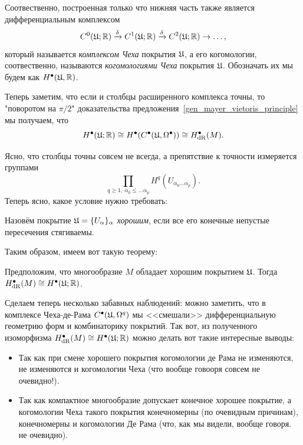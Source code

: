 	 \begin{definition} 
	 	Соотвественно, построенная только что нижняя часть также является дифференциальным комплексом 
	 \[
	 	C^{0}(\mathfrak{U}; \mathbb{R}) \xrightarrow{\delta} C^{1}(\mathfrak{U}; \mathbb{R}) \xrightarrow{\delta} C^{2}(\mathfrak{U}; \mathbb{R})  \to \ldots,
	 \]
	 который называется \emph{комплексом Чеха} покрытия $\mathfrak{U}$, а его когомологии, соотвественно, называются \emph{когомологиями Чеха} покрытия $\mathfrak{U}$. Обозначать их мы будем как $H^{\bullet}(\mathfrak{U}, \mathbb{R})$. 

	 \end{definition}

	 
	 Теперь  заметим, что если и столбцы расширенного комплекса точны, то "поворотом на $\pi/2$" доказательства предложения~\ref{gen_mayer_vietoris_principle} мы получаем, что
	 \[
	  	H^{\bullet}(\mathfrak{U}; \mathbb{R}) \cong H^{\bullet}(C^{\bullet}(\mathfrak{U}, \Omega^{\bullet})) \cong H^{\bullet}_{\operatorname{dR}}(M).
	  \] 

	  Ясно, что столбцы точны совсем не всегда, а препятствие к точности измеряется группами 
	  \[
	  	\prod_{q \ge 1, \ \alpha_0 \le \ldots \alpha_p} H^{q}(U_{\alpha_0 \ldots \alpha_p}).
	  \]
	  Теперь ясно, какое условие нужно требовать: 

	  \begin{definition} 
	  	Назовём покрытие $\mathfrak{U} = \{ U_{\alpha} \}_{\alpha}$ \emph{хорошим}, если все его конечные непустые пересечения стягиваемы. 
	  \end{definition}

	  Таким образом, имеем вот такую теорему: 

	  \begin{theorem} 
	  		Предположим, что многообразие $M$ обладает хорошим покрытием  $\mathfrak{U}$. Тогда $H^{\bullet}_{\operatorname{dR}}(M) \cong H^{\bullet}(\mathfrak{U}; \mathbb{R})$.
	  \end{theorem}

	  Сделаем теперь несколько забавных наблюдений: можно заметить, что в комплексе Чеха-де-Рама $C^{\bullet}(\mathfrak{U}, \Omega^{q})$ мы <<смешали>> дифференциальную геометрию форм и комбинаторику покрытий. Так вот, из полученного изоморфизма $H^{\bullet}_{\operatorname{dR}}(M) \cong H^{\bullet}(\mathfrak{U}; \mathbb{R})$ можно делать вот такие интересные выводы: 

	  \begin{itemize}
	  	\item Так как при смене хорошего покрытия когомологии де Рама не изменяются, не изменяются и когомологии Чеха (что вообще говооря совсем не очевидно!). 

	  	\item Так как компактное многообразие допускает конечное хорошее покрытие, а когомологии Чеха такого покрытия конечномерны (по очевидным причинам), конечномерны и когомологии Де Рама (что, как мы видели, вообще говоря. не очевидно). 
	  \end{itemize}







 	  







